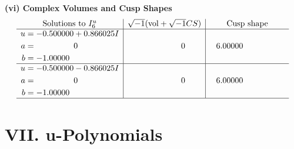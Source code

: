 \documentclass[1p]{elsarticle_modified}
\theoremstyle{definition}
\newcommand{\I}{\sqrt{-1}}
\begin{document}
\newpage\flushleft \textbf{(vi) Complex Volumes and Cusp Shapes}
$$\begin{array}{c|c|c}  
\text{Solutions to }I^u_{6}& \I (\text{vol} + \sqrt{-1}CS) & \text{Cusp shape}\\
 \hline 
\begin{aligned}
u &= -0.500000 + 0.866025 I \\
a &= \phantom{-0.000000 } 0 \\
b &= -1.00000\phantom{ +0.000000I}\end{aligned}
 & \phantom{-0.000000 } 0 & \phantom{-}6.00000\phantom{ +0.000000I} \\ \hline\begin{aligned}
u &= -0.500000 - 0.866025 I \\
a &= \phantom{-0.000000 } 0 \\
b &= -1.00000\phantom{ +0.000000I}\end{aligned}
 & \phantom{-0.000000 } 0 & \phantom{-}6.00000\phantom{ +0.000000I}\\
 \hline 
 \end{array}$$\newpage
\newpage\renewcommand{\arraystretch}{1}
\centering \section*{ VII. u-Polynomials}
\end{document}
